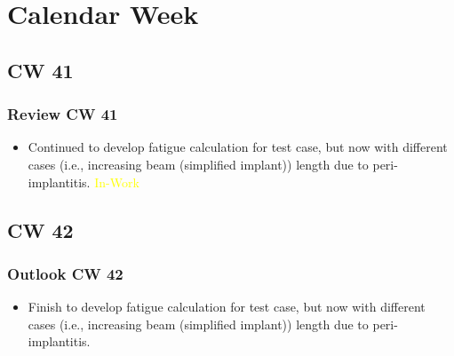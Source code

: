 \section{Calendar Week}
\subsection{CW 41}
\begin{frame}
  \frametitle{Review CW 41}
	\begin{itemize}
		\item Continued to develop fatigue calculation for test case, but now with different cases (i.e., increasing beam (simplified implant)) length due to peri-implantitis. \textcolor{yellow}{In-Work}
	\end{itemize}
\end{frame}

\subsection{CW 42}
\begin{frame}
  \frametitle{Outlook CW 42}
	\begin{itemize}
		\item Finish to develop fatigue calculation for test case, but now with different cases (i.e., increasing beam (simplified implant)) length due to peri-implantitis. 
	\end{itemize}
\end{frame}


